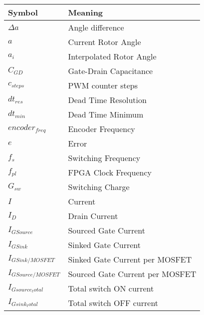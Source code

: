\begin{table}[H]
\centering
\begin{tabular}{|l|l|}
\hline
\textbf{Symbol}      & \textbf{Meaning}                               \\ \hline
$\Delta a$           & Angle difference                               \\ \hline
$a$                  & Current Rotor Angle                            \\ \hline
$a_i$                & Interpolated Rotor Angle                       \\ \hline
$C_{GD}$             & Gate-Drain Capacitance                         \\ \hline
$c_{steps}$          & PWM counter steps                              \\ \hline
$dt_{res}$           & Dead Time Resolution                           \\ \hline
$dt_{min}$           & Dead Time Minimum                              \\ \hline
$encoder_{freq}$     & Encoder Frequency                              \\ \hline
$e$                  & Error                                          \\ \hline
$f_{s}$              & Switching Frequency                            \\ \hline
$f_{pl}$             & FPGA Clock Frequency                           \\ \hline
$G_{sw}$             & Switching Charge                               \\ \hline
$I$                  & Current                                        \\ \hline
$I_{D}$              & Drain Current                                  \\ \hline
$I_{GSource}$        & Sourced Gate Current                           \\ \hline
$I_{GSink}$          & Sinked Gate Current                            \\ \hline
$I_{GSink/MOSFET}$   & Sinked Gate Current per MOSFET                 \\ \hline
$I_{GSource/MOSFET}$ & Sourced Gate Current per MOSFET                \\ \hline
$I_{Gsource_total}$  & Total switch ON current                        \\ \hline
$I_{Gsink_total}$    & Total switch OFF current                       \\ \hline

\end{tabular}
\end{table}
